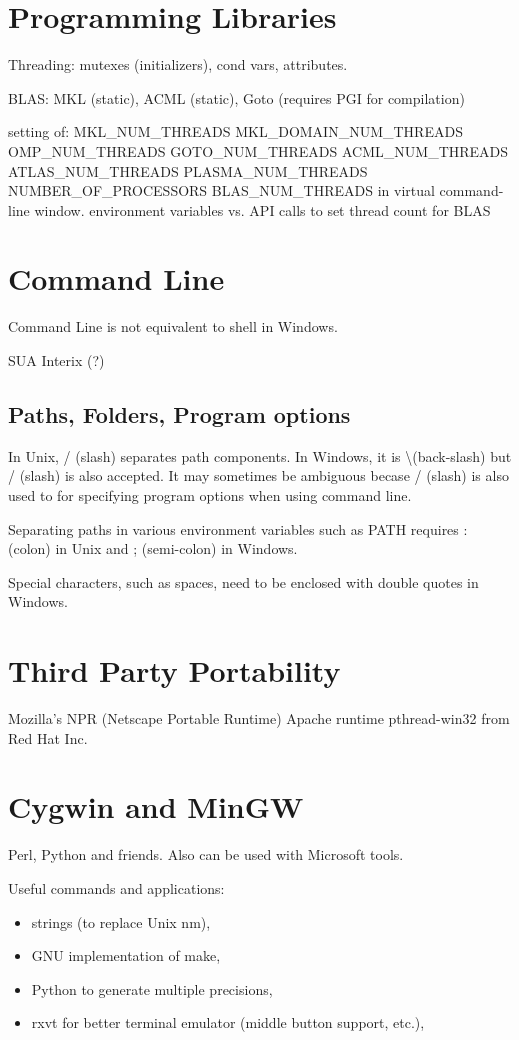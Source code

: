 \documentclass[letterpaper]{article}
\newcommand\Win{Windows\texttrademark\xspace}
\begin{document}
\section{Programming Libraries}
Threading: mutexes (initializers), cond vars, attributes.

BLAS: MKL (static), ACML (static), Goto (requires PGI for compilation)

setting of:
MKL\_NUM\_THREADS
MKL\_DOMAIN\_NUM\_THREADS
OMP\_NUM\_THREADS
GOTO\_NUM\_THREADS
ACML\_NUM\_THREADS
ATLAS\_NUM\_THREADS
PLASMA\_NUM\_THREADS
NUMBER\_OF\_PROCESSORS
BLAS\_NUM\_THREADS
in virtual command-line window. environment variables vs. API calls to set thread count
for BLAS

\section{Command Line}
Command Line is not equivalent to shell in \Win.

SUA Interix (?)

\subsection{Paths, Folders, Program options}
In Unix, / (slash) separates path components. In Windows, it is \textbackslash (back-slash)
but / (slash) is also accepted. It may sometimes be ambiguous becase / (slash)
is also used to for specifying program options when using command line.

Separating paths in various environment variables such as PATH requires : (colon)
in Unix and ; (semi-colon) in Windows.

Special characters, such as spaces, need to be enclosed with double quotes in Windows.

\section{Third Party Portability}
Mozilla's NPR (Netscape Portable Runtime)
Apache runtime
pthread-win32 from Red Hat Inc.

\section{Cygwin and MinGW}
Perl, Python and friends. Also can be used with Microsoft tools.

Useful commands and applications:
\begin{itemize}
\item strings (to replace Unix nm),
\item GNU implementation of make,
\item Python to generate multiple precisions,
\item rxvt for better terminal emulator (middle button support, etc.),
\end{itemize}
\end{document}
